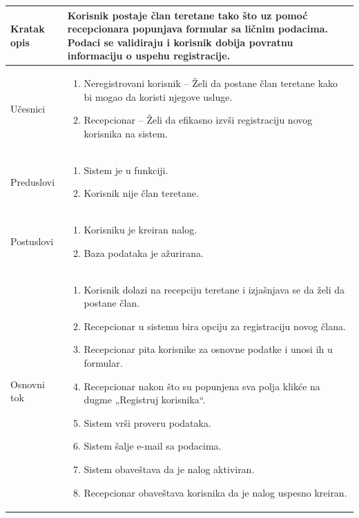 \documentclass[../main.tex]{subfiles}
\begin{document}
\begin{longtable}{| p{} | p{} |} 
\hline
    Kratak opis &  Korisnik postaje član teretane tako što uz pomoć recepcionara popunjava formular sa ličnim podacima. Podaci se validiraju i korisnik dobija povratnu informaciju o uspehu registracije.\\ 
\hline    
    Učesnici & \begin{enumerate}
        \item Neregistrovani korisnik – Želi da postane član teretane kako bi mogao da koristi njegove usluge.
        \item Recepcionar – Želi da efikasno izvši registraciju novog korisnika na sistem.
     \end{enumerate}\\
\hline
   Preduslovi & \begin{enumerate}
       \item Sistem je u funkciji.
       \item Korisnik nije član teretane.
   \end{enumerate}\\
\hline  
    Postuslovi & \begin{enumerate}
        \item Korisniku je kreiran nalog.
        \item Baza podataka je ažurirana.
    \end{enumerate}\\
\hline
    Osnovni tok & \begin{enumerate}
        \item Korisnik dolazi na recepciju teretane i izjašnjava se da želi da postane član.
        \item Recepcionar u sistemu bira opciju za registraciju novog člana.
        \item Recepcionar pita korisnike za osnovne podatke i unosi ih u formular.
        \item Recepcionar nakon što su popunjena sva polja klikće na dugme „Registruj korisnika“.
        \item Sistem vrši proveru podataka.
        \item Sistem šalje e-mail sa podacima.
        \item Sistem obaveštava da je nalog aktiviran.
        \item Recepcionar obaveštava korisnika da je nalog uspesno kreiran.

\end{enumerate}
\end{longtable}
\end{document}
